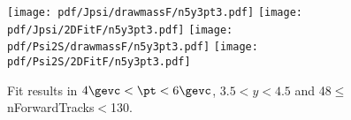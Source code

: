 \begin{figure}[H]
\begin{center}
\texttt{[image: pdf/Jpsi/drawmassF/n5y3pt3.pdf]}
\texttt{[image: pdf/Jpsi/2DFitF/n5y3pt3.pdf]}
\vspace*{-0.5cm}
\texttt{[image: pdf/Psi2S/drawmassF/n5y3pt3.pdf]}
\texttt{[image: pdf/Psi2S/2DFitF/n5y3pt3.pdf]}
\vspace*{-0.5cm}
\end{center}
\caption{Fit results in $4\gevc<\pt<6\gevc$, $3.5<y<4.5$ and 48$\leq$nForwardTracks$<$130.}
\label{Fitn5y3pt3}
\end{figure}
